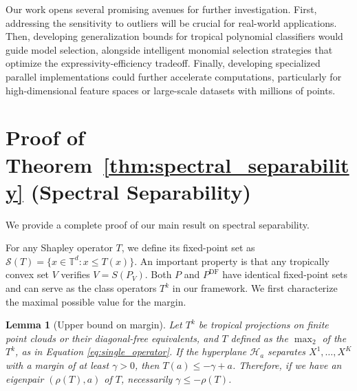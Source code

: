 \documentclass{article}
\newtheorem{lemma}[theorem]{Lemma}
\renewcommand{\leq}{\leqslant}
\newcommand{\trop}{\mathbb{T}}
\begin{document}
Our work opens several promising avenues for further investigation. First, addressing the sensitivity to outliers will be crucial for real-world applications. Then, developing generalization bounds for tropical polynomial classifiers would guide model selection, alongside intelligent monomial selection strategies that optimize the expressivity-efficiency tradeoff. Finally, developing specialized parallel implementations could further accelerate computations, particularly for high-dimensional feature spaces or large-scale datasets with millions of points.




\newpage
\appendix
\section{Proof of Theorem~\ref{thm:spectral_separability} (Spectral Separability)}\label{appendix:proofs}
We provide a complete proof of our main result on spectral separability.

For any Shapley operator $T$, we define its fixed-point set as $\mathcal{S}(T) = \{x \in \trop^d : x \leq T(x)\}$. An important property is that any tropically convex set $V$ verifies $V = S(P_V)$.
Both $P$ and $P^\text{DF}$ have identical fixed-point sets and can serve as the class operators $T^k$ in our framework. We first characterize the maximal possible value for the margin.

\begin{lemma}[Upper bound on margin]\label{lemma:hyperplane_to_operator}
Let $T^k$ be tropical projections on finite point clouds or their diagonal-free equivalents, and $T$ defined as the $\max_2$ of the $T^k$, as in Equation \ref{eq:single_operator}.
If the hyperplane $\mathcal{H}_a$ separates $X^1,\ldots,X^K$ with a margin of at least $\gamma > 0$, then $T(a) \leq -\gamma + a$.
Therefore, if we have an eigenpair $(\rho(T),a)$ of $T$, necessarily $\gamma \le -\rho(T)$.
\end{lemma}
\end{document}
